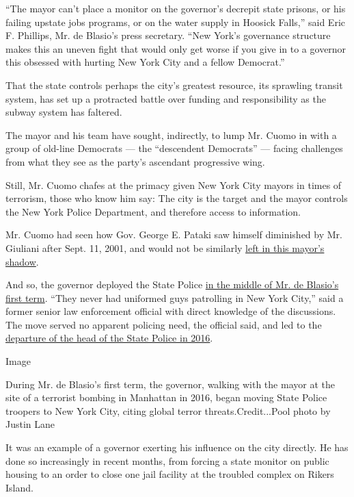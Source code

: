 ``The mayor can't place a monitor on the governor's decrepit state
prisons, or his failing upstate jobs programs, or on the water supply in
Hoosick Falls,'' said Eric F. Phillips, Mr. de Blasio's press secretary.
``New York's governance structure makes this an uneven fight that would
only get worse if you give in to a governor this obsessed with hurting
New York City and a fellow Democrat.''

That the state controls perhaps the city's greatest resource, its
sprawling transit system, has set up a protracted battle over funding
and responsibility as the subway system has faltered.

The mayor and his team have sought, indirectly, to lump Mr. Cuomo in
with a group of old-line Democrats --- the ``descendent Democrats'' ---
facing challenges from what they see as the party's ascendant
progressive wing.

Still, Mr. Cuomo chafes at the primacy given New York City mayors in
times of terrorism, those who know him say: The city is the target and
the mayor controls the New York Police Department, and therefore access
to information.

Mr. Cuomo had seen how Gov. George E. Pataki saw himself diminished by
Mr. Giuliani after Sept. 11, 2001, and would not be similarly
\href{https://www.nytimes3xbfgragh.onion/2002/04/18/nyregion/cuomo-s-criticism-of-pataki-s-role-after-9-11-sets-off-furor.html}{left
in this mayor's shadow}.

And so, the governor deployed the State Police
\href{https://www.dnainfo.com/new-york/20151105/midtown/cuomo-orders-more-state-police-into-nyc-boost-his-presence-here-sources/}{in
the middle of Mr. de Blasio's first term}. ``They never had uniformed
guys patrolling in New York City,'' said a former senior law enforcement
official with direct knowledge of the discussions. The move served no
apparent policing need, the official said, and led to the
\href{https://www.nytimes3xbfgragh.onion/2016/04/09/nyregion/new-york-state-police-leader-is-stepping-down.html}{departure
of the head of the State Police in 2016}.

Image

During Mr. de Blasio's first term, the governor, walking with the mayor
at the site of a terrorist bombing in Manhattan in 2016, began moving
State Police troopers to New York City, citing global terror
threats.Credit...Pool photo by Justin Lane

It was an example of a governor exerting his influence on the city
directly. He has done so increasingly in recent months, from forcing a
state monitor on public housing to an order to close one jail facility
at the troubled complex on Rikers Island.


